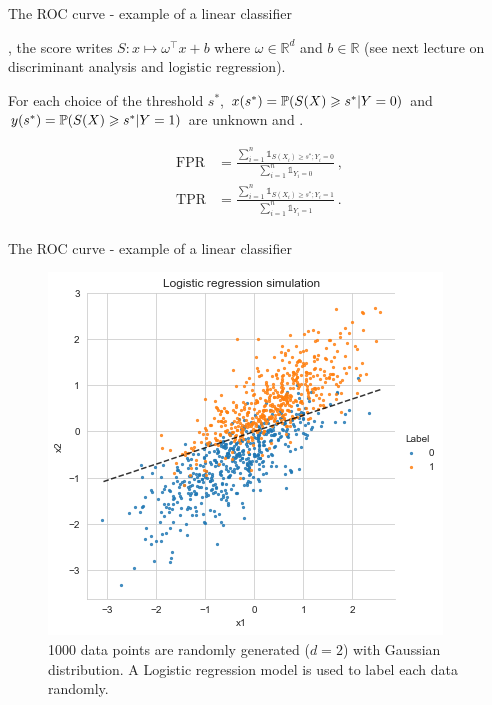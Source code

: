 \documentclass[xcolor={usenames,dvipsnames},handout]{beamer}
\begin{document}
\begin{frame}{The ROC curve - example of a linear classifier}


, the score writes $S:x\mapsto \omega^\top x + b$ where $\omega\in\mathbb{R}^d$ and $b\in\mathbb{R}$ (see next lecture on {\color{Vert} discriminant analysis and logistic regression}). 

\vspace{.4cm}

For each choice of the threshold $s^*$,  $x(s^*) = \P ( S(X)\geq s^*| Y=0) $  and $y(s^*) = \P (S(X) \geq s^* | Y=1)$ are unknown and .


\vspace{.3cm}

\begin{align*}
\mathrm{FPR} &= \frac{\sum_{i=1}^n \mathds{1}_{S(X_i)\geq s^* ; Y_i = 0}}{\sum_{i=1}^n \mathds{1}_{Y_i = 0}}\,,\\
\mathrm{TPR} &= \frac{\sum_{i=1}^n \mathds{1}_{S(X_i)\geq s^* ; Y_i = 1}}{\sum_{i=1}^n \mathds{1}_{Y_i = 1}}\,.\\
\end{align*}


\end{frame}


\begin{frame}{The ROC curve - example of a linear classifier}

\begin{figure}[h]
		\center
		\includegraphics[height=0.75\textheight]{log_reg}
		\caption{1000 data points are randomly generated ($d=2$) with Gaussian distribution. A Logistic regression model is used to label each data randomly. }
		\label{fig:roc}
	\end{figure}
\end{frame}
\end{document}
